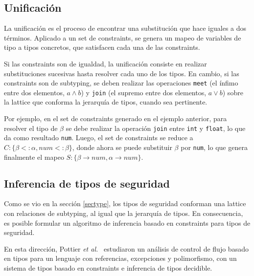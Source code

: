 \subsection{Unificación}
La unificación es el proceso de encontrar una substitución que hace iguales a dos términos. Aplicado a un set de constraints, se genera un mapeo de variables de tipo a tipos concretos, que satisfacen cada una de las constraints.

Si las constraints son de igualdad, la unificación consiste en realizar substituciones sucesivas hasta resolver cada uno de los tipos. En cambio, si las constraints son de subtyping, se deben realizar las operaciones \texttt{meet} (el ínfimo entre dos elementos, $a \wedge b$) y \texttt{join} (el supremo entre dos elementos, $a \vee b$) sobre la lattice que conforma la jerarquía de tipos, cuando sea pertinente.

Por ejemplo, en el set de constraints generado en el ejemplo anterior, para resolver el tipo de $\beta$ se debe realizar la operación \texttt{join} entre \texttt{int} y \texttt{float}, lo que da como resultado \texttt{num}. Luego, el set de constraints se reduce a $C: \{\beta <: \alpha, num <: \beta\}$, donde ahora se puede substituir $\beta$ por \texttt{num}, lo que genera finalmente el mapeo $S: \{\beta \rightarrow num, \alpha \rightarrow num\}$.
\subsection{Inferencia de tipos de seguridad}
Como se vio en la sección \ref{sectype}, los tipos de seguridad conforman una lattice con relaciones de subtyping, al igual que la jerarquía de tipos. En consecuencia, es posible formular un algoritmo de inferencia basado en constraints para tipos de seguridad.

En esta dirección, Pottier \textit{et al.}~\cite{Pottier} estudiaron un análisis de control de flujo basado en tipos para un lenguaje con referencias, excepciones y polimorfismo, con un sistema de tipos basado en constraints e inferencia de tipos decidible.
